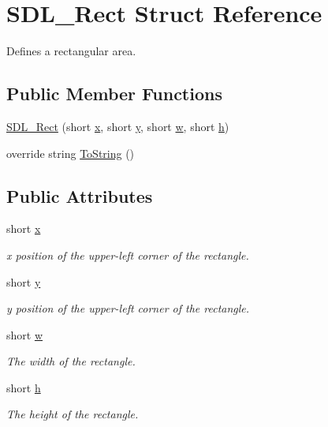 \hypertarget{struct_s_d_l___rect}{
\section{SDL\_\-Rect Struct Reference}
\label{struct_s_d_l___rect}
}


Defines a rectangular area.  


\subsection*{Public Member Functions}
\begin{DoxyCompactItemize}
\item 
\hyperlink{struct_s_d_l___rect_acbb881fd6495d0c38ce2f817f6a7ab54}{SDL\_\-Rect} (short \hyperlink{struct_s_d_l___rect_a1efa4d3799ed735ca60655d32d01b4a3}{x}, short \hyperlink{struct_s_d_l___rect_a5be726a205a1d331cd4905b6de6ccc39}{y}, short \hyperlink{struct_s_d_l___rect_ab518d01dcd4fbe7b2fa7d8e1e3673eb9}{w}, short \hyperlink{struct_s_d_l___rect_ae91e0942999f1cae9195250aed976df9}{h})
\item 
override string \hyperlink{struct_s_d_l___rect_a2e759916b407458b3b7f4c161bd75d47}{ToString} ()
\end{DoxyCompactItemize}
\subsection*{Public Attributes}
\begin{DoxyCompactItemize}
\item 
short \hyperlink{struct_s_d_l___rect_a1efa4d3799ed735ca60655d32d01b4a3}{x}
\begin{DoxyCompactList}\small\item\em x position of the upper-\/left corner of the rectangle. \item\end{DoxyCompactList}\item 
short \hyperlink{struct_s_d_l___rect_a5be726a205a1d331cd4905b6de6ccc39}{y}
\begin{DoxyCompactList}\small\item\em y position of the upper-\/left corner of the rectangle. \item\end{DoxyCompactList}\item 
short \hyperlink{struct_s_d_l___rect_ab518d01dcd4fbe7b2fa7d8e1e3673eb9}{w}
\begin{DoxyCompactList}\small\item\em The width of the rectangle. \item\end{DoxyCompactList}\item 
short \hyperlink{struct_s_d_l___rect_ae91e0942999f1cae9195250aed976df9}{h}
\begin{DoxyCompactList}\small\item\em The height of the rectangle. \item\end{DoxyCompactList}\end{DoxyCompactItemize}


